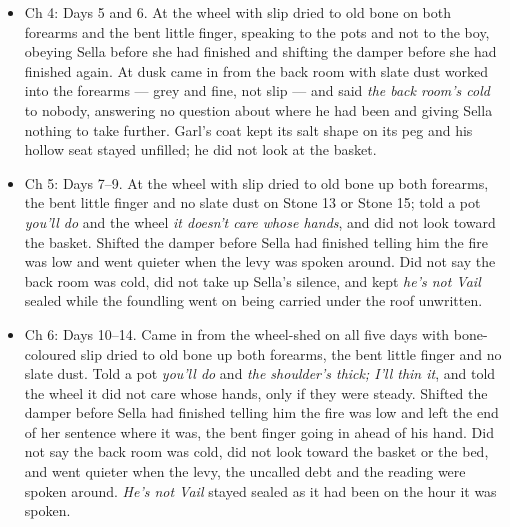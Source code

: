 \documentclass{design/chronicle}
\begin{document}
{\begin{itemize}[leftmargin=1.4em,itemsep=1pt,topsep=3pt,parsep=0pt]
\end{itemize}

\begin{itemize}[leftmargin=1.4em,itemsep=1pt,topsep=3pt,parsep=0pt]

\item Ch 4: Days 5 and 6. At the wheel with slip dried to old bone on both forearms and the bent little finger, speaking to the pots and not to the boy, obeying Sella before she had finished and shifting the damper before she had finished again. At dusk came in from the back room with slate dust worked into the forearms --- grey and fine, not slip --- and said \emph{the back room’s cold} to nobody, answering no question about where he had been and giving Sella nothing to take further. Garl’s coat kept its salt shape on its peg and his hollow seat stayed unfilled; he did not look at the basket.

\end{itemize}

\begin{itemize}[leftmargin=1.4em,itemsep=1pt,topsep=3pt,parsep=0pt]

\item Ch 5: Days 7--9. At the wheel with slip dried to old bone up both forearms, the bent little finger and no slate dust on Stone 13 or Stone 15; told a pot \emph{you’ll do} and the wheel \emph{it doesn’t care whose hands}, and did not look toward the basket. Shifted the damper before Sella had finished telling him the fire was low and went quieter when the levy was spoken around. Did not say the back room was cold, did not take up Sella’s silence, and kept \emph{he’s not Vail} sealed while the foundling went on being carried under the roof unwritten.

\end{itemize}

\begin{itemize}[leftmargin=1.4em,itemsep=1pt,topsep=3pt,parsep=0pt]

\item Ch 6: Days 10--14. Came in from the wheel-shed on all five days with bone-coloured slip dried to old bone up both forearms, the bent little finger and no slate dust. Told a pot \emph{you’ll do} and \emph{the shoulder’s thick; I’ll thin it}, and told the wheel it did not care whose hands, only if they were steady. Shifted the damper before Sella had finished telling him the fire was low and left the end of her sentence where it was, the bent finger going in ahead of his hand. Did not say the back room was cold, did not look toward the basket or the bed, and went quieter when the levy, the uncalled debt and the reading were spoken around. \emph{He’s not Vail} stayed sealed as it had been on the hour it was spoken.


\end{itemize}}
\end{document}
